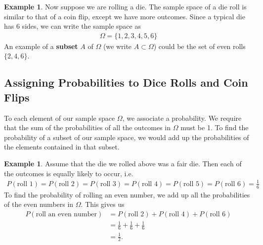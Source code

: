 \documentclass{tufte-book}
\theoremstyle{definition}
\numberwithin{theorem}{section}
\numberwithin{definition}{section}
\numberwithin{lemma}{section}
\numberwithin{corollary}{section}
\numberwithin{proposition}{section}
\numberwithin{remark}{section}
\numberwithin{claim}{section}
\numberwithin{observation}{section}
\numberwithin{fact}{section}
\numberwithin{assumption}{section}
\newtheorem{example}[theorem]{Example}
\numberwithin{example}{section}
\numberwithin{exercise}{section}
\begin{document}
\begin{example}
Now suppose we are rolling a die. The sample space of a die roll is similar to that of a coin flip, except we have more outcomes. Since a typical die has 6 sides, we can write the sample space as
\begin{align*}
\Omega = \{1,2,3,4,5,6\}
\end{align*}
An example of a \textbf{subset} $A$ of $\Omega$ (we write $A \subset \Omega$) could be the set of even rolls $\{2,4,6\}$. 

\end{example}

\subsection{Assigning Probabilities to Dice Rolls and Coin Flips}
To each element of our sample space $\Omega$, we associate a probability. We require that the sum of the probabilities of all the outcomes in $\Omega$ must be 1. To find the probability of a subset of our sample space, we would add up the probabilities of the elements contained in that subset.

\begin{example}
Assume that the die we rolled above was a fair die. Then each of the outcomes is equally likely to occur, i.e.
\begin{align*}
P(\text{roll 1}) = P(\text{roll 2}) = P(\text{roll 3}) = P(\text{roll 4}) = P(\text{roll 5}) = P(\text{roll 6}) = \frac{1}{6}
\end{align*}
To find the probability of rolling an even number, we add up all the probabilities of the even numbers in $\Omega$. This gives us
\begin{align*}
P(\text{roll an even number}) &= P(\text{roll 2}) + P(\text{roll 4}) + P(\text{roll 6}) \\
&= \frac{1}{6} + \frac{1}{6} + \frac{1}{6} \\
&= \frac{1}{2}.
\end{align*}
\end{example}
\end{document}
